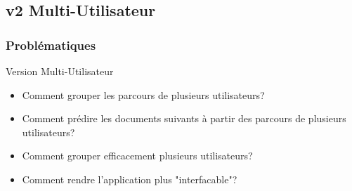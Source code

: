 \documentclass{beamer}
\begin{document}
        \subsection{v2 Multi-Utilisateur}
            \begin{frame}
                \frametitle{Problématiques}
                Version Multi-Utilisateur
                \pause
                \begin{itemize}
                    \item Comment grouper les parcours de plusieurs utilisateurs?
                    \pause
                    \item Comment prédire les documents suivants à partir des parcours de plusieurs utilisateurs?
                    \pause
                    \item Comment grouper efficacement plusieurs utilisateurs?
                    \pause
                    \item Comment rendre l'application plus "interfacable"?
                \end{itemize}
            \end{frame}
\end{document}
